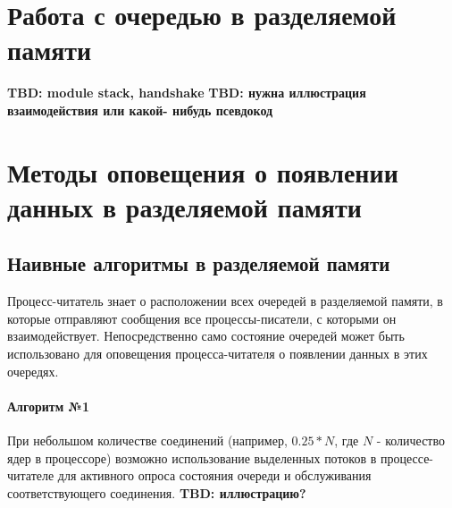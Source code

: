 %
%
%
%
%

\section{Работа с очередью в разделяемой памяти}\label{chapter31:SharedMemoryOptimization}

\textbf{TBD: module stack, handshake}
\textbf{TBD: нужна иллюстрация взаимодействия или какой- нибудь псевдокод}

\section{Методы оповещения о появлении данных в разделяемой памяти}

\subsection{Наивные алгоритмы в разделяемой памяти}

Процесс-читатель знает о расположении всех очередей в разделяемой памяти, в которые отправляют сообщения все процессы-писатели, с которыми он взаимодействует. Непосредственно само состояние очередей может быть использовано для оповещения процесса-читателя о появлении данных в этих очередях.

\paragraph{Алгоритм №1}

При небольшом количестве соединений (например, $0.25 * N$, где $N$ - количество ядер в процессоре) возможно использование выделенных потоков в процессе-читателе для активного опроса состояния очереди и обслуживания соответствующего соединения.  \textbf{TBD: иллюстрацию?}


